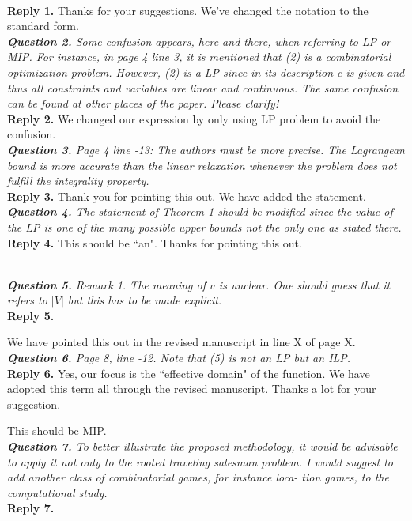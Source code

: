 \documentclass[11pt]{article}
\begin{document}
\\[2mm]
\noindent \textbf{Reply 1.}
Thanks for your suggestions.
We've changed the notation to the standard form.
\\[4mm]
%
%
%
\noindent \textit{\textbf{Question 2.}
Some confusion appears, here and there, when referring to LP or MIP.
For instance, in page 4 line 3, it is mentioned that (2) is a combinatorial
optimization problem. However, (2) is a LP since in its description c is
given and thus all constraints and variables are linear and continuous.
The same confusion can be found at other places of the paper. Please
clarify!}
\\[2mm]
\noindent \textbf{Reply 2.}
We changed our expression by only using LP problem to avoid the confusion.
\\[4mm]
%
%
%
\noindent \textit{\textbf{Question 3.}
Page 4 line -13: The authors must be more precise. The Lagrangean
bound is more accurate than the linear relaxation whenever the problem does not fulfill the integrality property.
}
\\[2mm]
\noindent \textbf{Reply 3.}
Thank you for pointing this out.
We have added the statement.
\\[4mm]
%
%
%
\noindent \textit{\textbf{Question 4.}
The statement of Theorem 1 should be modified since the value of the
LP is one of the many possible upper bounds not the only one as stated
there.
}
\\[2mm]
\noinden \textbf{Reply 4.}
This should be ``an". Thanks for pointing this out.

\\[4mm]
%
%
%
\noindent \textit{\textbf{Question 5.}
Remark 1. The meaning of $v$ is unclear. One should guess that it refers
to $|V|$ but this has to be made explicit.
}
\\[2mm]
\noindent \textbf{Reply 5.}

We have pointed this out in the revised manuscript in line X of page X.
\\[4mm]
%
%
%
\noindent \textit{\textbf{Question 6.}
Page 8, line -12. Note that (5) is not an LP but an ILP.
}
\\[2mm]
\noindent \textbf{Reply 6.}
Yes, our focus is the ``effective domain" of the function.
We have adopted this term all through the revised manuscript.
Thanks a lot for your suggestion.

This should be MIP.
\\[4mm]
%
%
%
\noindent \textit{\textbf{Question 7.}
To better illustrate the proposed methodology, it would be advisable
to apply it not only to the rooted traveling salesman problem. I would
suggest to add another class of combinatorial games, for instance loca-
tion games, to the computational study.}
\\[2mm]
\noindent \textbf{Reply 7.}
\end{document}
